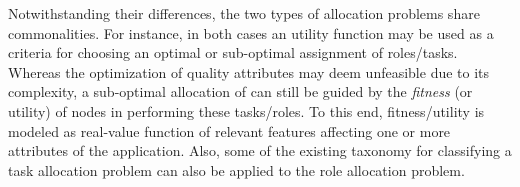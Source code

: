 Notwithstanding their differences, the two types of allocation problems share commonalities. For instance, in both cases an utility function may be used as a criteria for choosing an optimal or sub-optimal assignment of roles/tasks. Whereas the optimization of quality attributes may deem unfeasible due to its complexity, a sub-optimal allocation of can still be guided by the \textit{fitness} (or utility) of nodes in performing these tasks/roles. To this end, fitness/utility is modeled as real-value function of relevant features affecting one or more attributes of the application. Also, some of the existing taxonomy for classifying a task allocation problem can also be applied to the role allocation problem.

